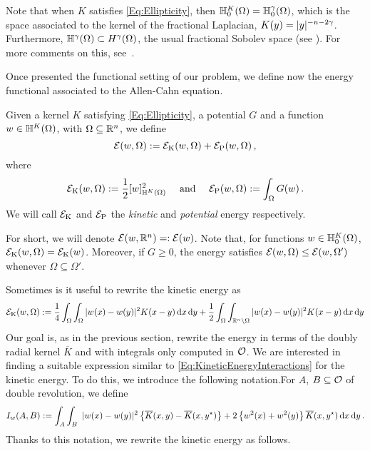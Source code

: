Note that when $K$ satisfies \eqref{Eq:Ellipticity}, then $\mathbb{H}^K_0 (\Omega) = \mathbb{H}^\gamma_0 (\Omega)$,
which is the space associated to the kernel of the fractional Laplacian, $K(y) = |y|^{-n-2\gamma}$.
Furthermore, $\mathbb{H}^\gamma(\Omega) \subset H^\gamma(\Omega)$, the usual fractional Sobolev space (see
\cite{HitchhikerGuide}).  For more comments on this, see~\cite{CozziPassalacqua}.

Once presented the functional setting of our problem, we define now  the energy functional associated to the Allen-Cahn equation. 

\begin{definition}
	Given a kernel $K$ satisfying \eqref{Eq:Ellipticity}, a potential $G$ and a function $w\in \mathbb{H}^K(\Omega)$, with $\Omega\subseteq \mathbb{R}^{n}$, we define
	$$
	\mathcal{E}(w, \Omega) := \mathcal{E}_\mathrm{K}(w,\Omega) + \mathcal{E}_\mathrm{P}(w,\Omega)\,,
	$$
	where
	$$
	\mathcal{E}_\mathrm{K}(w, \Omega) := \dfrac{1}{2} [w]^2_{\mathbb{H}^K(\Omega)} \quad \text{ and } \quad  \mathcal{E}_\mathrm{P}(w, \Omega) := \int_{\Omega} G(w)
	\,.
	$$
	We will call $\mathcal{E}_\mathrm{K}$ and $\mathcal{E}_\mathrm{P}$ the \emph{kinetic} and \emph{potential} energy respectively.
\end{definition}


For short, we will denote $\mathcal{E}(w, \mathbb{R}^n) =: \mathcal{E}(w)$. Note that, for functions $w\in \mathbb{H}^K_0(\Omega)$, $\mathcal{E}_\mathrm{K}(w,\Omega) = \mathcal{E}_\mathrm{K}(w)$. Moreover, if $G\geq 0$, the energy satisfies $
\mathcal{E}(w, \Omega) \leq \mathcal{E}(w, \Omega')$  whenever $ \Omega \subseteq \Omega'$.

Sometimes is it useful to rewrite the kinetic energy as
\begin{equation}
	\label{Eq:KineticEnergyInteractions}
	\mathcal{E}_\mathrm{K}(w, \Omega) := \dfrac{1}{4} \int_\Omega \int_\Omega |w(x) - w(y)|^2 K(x-y) \,\mathrm{d} x \,\mathrm{d} y + \dfrac{1}{2} \int_\Omega \int_{\mathbb{R}^n \setminus \Omega} |w(x) - w(y)|^2 K(x-y) \,\mathrm{d} x \,\mathrm{d} y	
\end{equation}
Our goal is, as in the previous section, rewrite the energy in terms of the doubly radial kernel $\overline{K}$ and with integrals only computed in $\mathcal{O}$. We are interested in finding a suitable expression similar to \eqref{Eq:KineticEnergyInteractions} for the kinetic energy. To do this, we introduce the following notation.For $A$, $B\subseteq \mathcal{O}$ of double revolution, we define
$$
I_w(A,B) := \int_A  \int_B  \ |w(x)-w(y)|^2 \left\{ \overline{K}(x,y) - \overline{K}(x,y^\star) \right\}  +2 \left\{w^2(x)+w^2(y)\right\} \overline{K}(x,y^\star) \,\mathrm{d} x \,\mathrm{d} y\,.
$$
Thanks to this notation, we rewrite the kinetic energy as follows.


